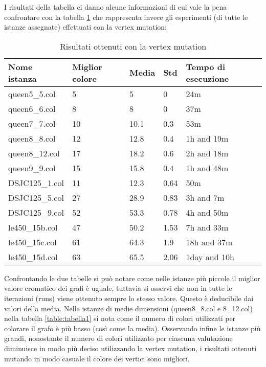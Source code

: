 \documentclass[12pt]{article}
\begin{document}
\begin{enumerate}
\noindent I risultati della tabella ci danno alcune informazioni di cui vale la pena confrontare con la tabella \ref{table:tabella2}  che rappresenta invece gli esperimenti (di tutte le istanze assegnate) effettuati con la vertex mutation:


\begin{table}[htbp]
\begin{center}
\begin{tabular}{|l|l|l|l|l|} 
 \toprule Nome istanza  & Miglior colore & Media & Std  & Tempo di esecuzione \\ 
\midrule
queen5\_5.col  & 5              & 5   & 0 & 24m                 \\ 
queen6\_6.col  & 8              & 8   & 0  & 37m                 \\ 
queen7\_7.col  & 10             & 10.1  & 0.3 & 53m           \\ 
queen8\_8.col  & 12             & 12.8  & 0.4 & 1h and 19m          \\ 
queen8\_12.col & 17             & 18.2  & 0.6 & 2h and 18m          \\ 
queen9\_9.col & 15             & 15.8  & 0.4 & 1h and 48m  \\ 
DSJC125\_1.col & 11             & 12.3  & 0.64 & 50m      \\ 
DSJC125\_5.col & 27             & 28.9  & 0.83 & 3h and 7m      \\ 
DSJC125\_9.col & 52             & 53.3  & 0.78 & 4h and 50m      \\ 
le450\_15b.col & 47             & 50.2  & 1.53 & 7h and 33m      \\ 
le450\_15c.col & 61             & 64.3  & 1.9 & 18h and 37m \\ 
le450\_15d.col & 63             & 65.5  & 2.06 & 1day and 10h      \\ 


\bottomrule
\end{tabular}
\caption{\label{table:tabella2} Risultati ottenuti con la vertex mutation}
\end{center}
\end{table}

 \noindent Confrontando le due tabelle si può notare come nelle istanze più piccole il miglior valore cromatico dei grafi è uguale, tuttavia si osservi che non in tutte le iterazioni (runs) viene ottenuto sempre lo stesso valore. Questo è deducibile dai valori della media. Nelle istanze di medie dimensioni (queen8\_8.col e 8\_12.col) nella tabella \ref{table:tabella1} si nota come il numero di colori utilizzati per colorare il grafo è più basso (così come la media). Osservando infine le istanze più grandi, nonostante il numero di colori utilizzato per ciascuna valutazione diminuisce in modo più deciso utilizzando la vertex mutation, i risultati ottenuti mutando in modo casuale il colore dei vertici sono migliori. 





\end{enumerate}
\end{document}

